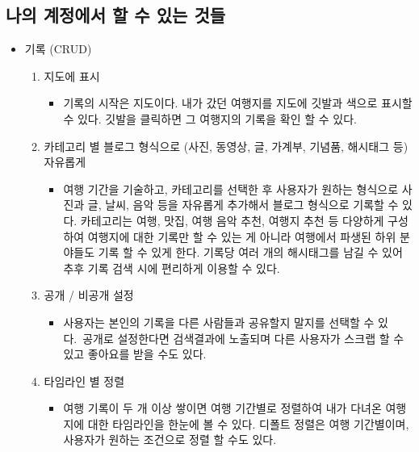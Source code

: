 
\subsection{나의 계정에서 할 수 있는 것들}

\begin{itemize}
    \item 기록 (CRUD)
    \begin{enumerate}
        \item 지도에 표시
            \begin{itemize}
                \item[] 기록의 시작은 지도이다. 내가 갔던 여행지를 지도에 깃발과 색으로 표시할 수 있다. 깃발을 클릭하면 그 여행지의 기록을 확인 할 수 있다.
            \end{itemize}
        \item 카테고리 별 블로그 형식으로 (사진, 동영상, 글, 가계부, 기념품, 해시태그 등) 자유롭게
            \begin{itemize}
                \item[] 여행 기간을 기술하고, 카테고리를 선택한 후 사용자가 원하는 형식으로 사진과 글, 날씨, 음악 등을 자유롭게 추가해서 블로그 형식으로 기록할 수 있다. 카테고리는 여행, 맛집, 여행 음악 추천, 여행지 추천 등 다양하게 구성하여 여행지에 대한 기록만 할 수 있는 게 아니라 여행에서 파생된 하위 분야들도 기록 할 수 있게 한다. 기록당 여러 개의 해시태그를 남길 수 있어 추후 기록 검색 시에 편리하게 이용할 수 있다.
            \end{itemize}
        \item 공개 / 비공개 설정
            \begin{itemize}
                \item[] 사용자는 본인의 기록을 다른 사람들과 공유할지 말지를 선택할 수 있다. 공개로 설정한다면 검색결과에 노출되며 다른 사용자가 스크랩 할 수 있고 좋아요를 받을 수도 있다.
            \end{itemize}
        \item 타임라인 별 정렬
        \begin{itemize}
            \item[] 여행 기록이 두 개 이상 쌓이면 여행 기간별로 정렬하여 내가 다녀온 여행지에 대한 타임라인을 한눈에 볼 수 있다. 디폴트 정렬은 여행 기간별이며, 사용자가 원하는 조건으로 정렬 할 수도 있다. 
        \end{itemize} 
    \end{enumerate}
\end{itemize}

